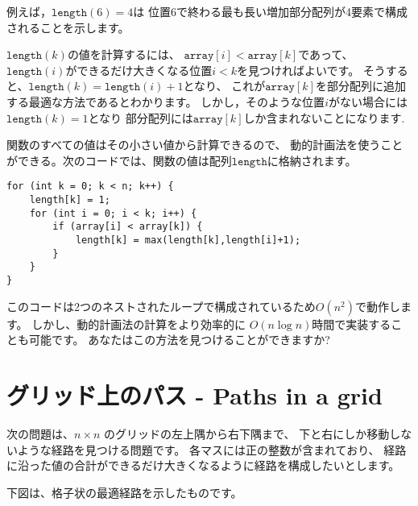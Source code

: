 例えば，$\texttt{length}(6)=4$は
位置6で終わる最も長い増加部分配列が4要素で構成されることを示します。

$\texttt{length}(k)$の値を計算するには、
$\texttt{array}[i]<\texttt{array}[k]$であって、
$\texttt{length}(i)$ができるだけ大きくなる位置$i < k$を見つければよいです。
そうすると、$\texttt{length}(k)=\texttt{length}(i)+1$となり、
これが$\texttt{array}[k]$を部分配列に追加する最適な方法であるとわかります。
しかし，そのような位置$i$がない場合には$\texttt{length}(k)=1$となり
部分配列には$\texttt{array}[k]$しか含まれないことになります.

関数のすべての値はその小さい値から計算できるので、
動的計画法を使うことができる。次のコードでは、関数の値は配列$\texttt{length}$に格納されます。

\begin{lstlisting}
for (int k = 0; k < n; k++) {
    length[k] = 1;
    for (int i = 0; i < k; i++) {
        if (array[i] < array[k]) {
            length[k] = max(length[k],length[i]+1);
        }
    }
}
\end{lstlisting}

このコードは2つのネストされたループで構成されているため$O(n^2)$で動作します。
しかし、動的計画法の計算をより効率的に $O(n \log n)$時間で実装することも可能です。
あなたはこの方法を見つけることができますか?

\section{グリッド上のパス - Paths in a grid}

次の問題は、$n \times n$ のグリッドの左上隅から右下隅まで、
下と右にしか移動しないような経路を見つける問題です。
各マスには正の整数が含まれており、
経路に沿った値の合計ができるだけ大きくなるように経路を構成したいとします。

下図は、格子状の最適経路を示したものです。

